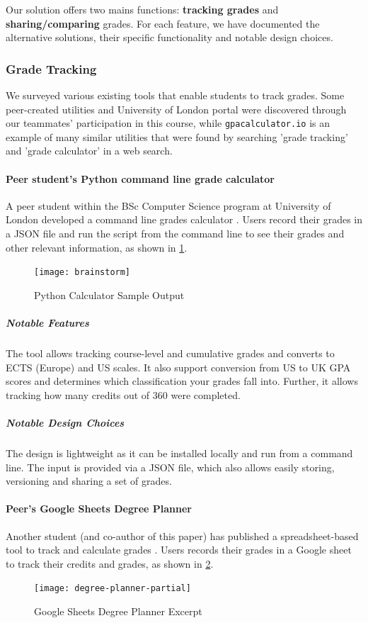 Our solution offers two mains functions: \textbf{tracking grades} and \textbf{sharing/comparing} grades. For each feature, we have documented the alternative solutions, their specific functionality and notable design choices.

\subsubsection{Grade Tracking}
We surveyed various existing tools that enable students to track grades. Some peer-created utilities and University of London portal were discovered through our teammates' participation in this course, while \texttt{gpacalculator.io} \cite{gpa_calculator} is an example of many similar utilities that were found by searching 'grade tracking' and 'grade calculator' in a web search.

\paragraph{Peer student's Python command line grade calculator}
A peer student within the BSc Computer Science program at University of London developed a command line grades calculator \cite{lavoie_2020}. Users record their grades in a JSON file and run the script from the command line to see their grades and other relevant information, as shown in \cref{fig:py-calc}.

\begin{figure}[H]
\centering
\texttt{[image: brainstorm]}
\caption{Python Calculator Sample Output}
\label{fig:py-calc}
\end{figure}

\subparagraph{Notable Features}
The tool allows tracking course-level and cumulative grades and converts to ECTS (Europe) and US scales. It also support conversion from US to UK GPA scores and determines which classification your grades fall into. Further, it allows tracking how many credits out of 360 were completed.

\subparagraph{Notable Design Choices}
The design is lightweight as it can be installed locally and run from a command line. The input is provided via a JSON file, which also allows easily storing, versioning and sharing a set of grades.

\paragraph{Peer's Google Sheets Degree Planner}
Another student (and co-author of this paper) has published a spreadsheet-based tool to track and calculate grades \cite{muralidharan_2020}. Users records their grades in a Google sheet to track their credits and grades, as shown in \cref{fig:deg-planner}.
\begin{figure}[H]
\noindent \texttt{[image: degree-planner-partial]}
\centering
\caption{Google Sheets Degree Planner Excerpt}
\label{fig:deg-planner}
\end{figure}

